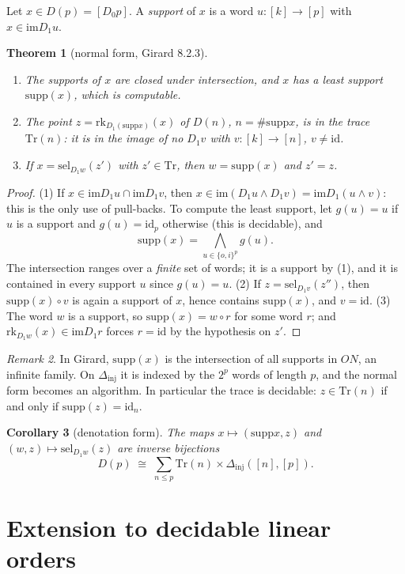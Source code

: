 \documentclass[11pt,a4paper]{article}
\newtheorem{theorem}{Theorem}[section]
\newtheorem{corollary}[theorem]{Corollary}
\theoremstyle{definition}
\theoremstyle{remark}
\newtheorem{remark}[theorem]{Remark}
\newcommand{\Dinj}{\Delta_{\mathrm{inj}}}
\newcommand{\Tr}{\mathrm{Tr}}
\newcommand{\supp}{\mathrm{supp}}
\newcommand{\rk}{\mathrm{rk}}
\newcommand{\sel}{\mathrm{sel}}
\newcommand{\im}{\mathrm{im}}
\newcommand{\id}{\mathrm{id}}
\begin{document}
Let $x \in D(p) = [D_0 p]$. A \emph{support} of $x$ is a word
$u : [k] \to [p]$ with $x \in \im D_1 u$.

\begin{theorem}[normal form, Girard 8.2.3]\label{th:nf}
\begin{enumerate}
\item The supports of $x$ are closed under intersection, and $x$ has a
  least support $\supp(x)$, which is computable.
\item The point $z = \rk_{D_1(\supp x)}(x)$ of $D(n)$, $n = \#\supp x$, is
  in the \emph{trace} $\Tr(n)$: it is in the image of no $D_1 v$ with
  $v : [k] \to [n]$, $v \neq \id$.
\item If $x = \sel_{D_1 w}(z')$ with $z' \in \Tr$, then $w = \supp(x)$ and
  $z' = z$.
\end{enumerate}
\end{theorem}

\begin{proof}
(1) If $x \in \im D_1 u \cap \im D_1 v$, then $x \in \im(D_1 u \wedge D_1
v) = \im D_1(u \wedge v)$: this is the only use of pull-backs. To compute
the least support, let $g(u) = u$ if $u$ is a support and $g(u) = \id_p$
otherwise (this is decidable), and
\[
\supp(x) = \bigwedge_{u \in \{o,i\}^p} g(u).
\]
The intersection ranges over a \emph{finite} set of words; it is a support
by (1), and it is contained in every support $u$ since $g(u) = u$.
(2) If $z = \sel_{D_1 v}(z'')$, then $\supp(x) \circ v$ is again a support
of $x$, hence contains $\supp(x)$, and $v = \id$. (3) The word $w$ is a
support, so $\supp(x) = w \circ r$ for some word $r$; and
$\rk_{D_1 w}(x) \in \im D_1 r$ forces $r = \id$ by the hypothesis on $z'$.
\end{proof}

\begin{remark}
In Girard, $\supp(x)$ is the intersection of all supports in $ON$, an
infinite family. On $\Dinj$ it is indexed by the $2^p$ words of length
$p$, and the normal form becomes an algorithm. In particular the trace is
decidable: $z \in \Tr(n)$ if and only if $\supp(z) = \id_n$.
\end{remark}

\begin{corollary}[denotation form]
The maps $x \mapsto (\supp x, z)$ and $(w, z) \mapsto \sel_{D_1 w}(z)$ are
inverse bijections
\[
D(p) \;\cong\; \sum_{n \le p} \Tr(n) \times \Dinj([n],[p]).
\]
\end{corollary}

\section{Extension to decidable linear orders}
\end{document}
